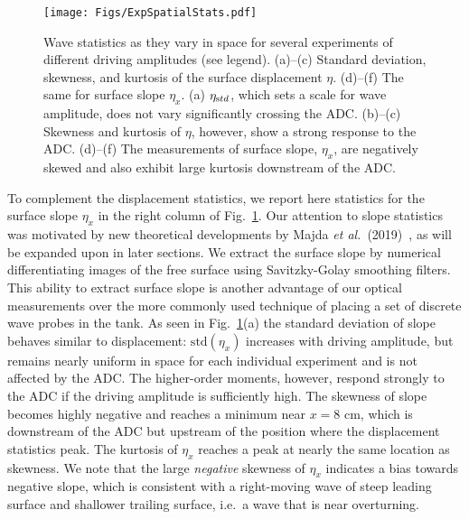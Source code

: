 \documentclass[11pt]{article}
\newcommand{\etastd}{\eta_{\text std}}
\newcommand{\std}{\text{std}}
\newcommand{\maetal}{Majda {\it et al.}~(2019)~}
\begin{document}
\begin{figure}%
\begin{center}
\texttt{[image: Figs/ExpSpatialStats.pdf]}
\caption{Wave statistics as they vary in space for several experiments of different driving amplitudes (see legend). (a)--(c) Standard deviation, skewness, and kurtosis of the surface displacement $\eta$. (d)--(f) The same for surface slope $\eta_x$. (a) $\etastd$, which sets a scale for wave amplitude, does not vary significantly crossing the ADC. (b)--(c) Skewness and kurtosis of $\eta$, however, show a strong response to the ADC. (d)--(f) The measurements of surface slope, $\eta_x$, are negatively skewed and also exhibit large kurtosis downstream of the ADC. }
\label{ExpSpatialStats}
\end{center}
\end{figure}
 
	To complement the displacement statistics, we report here statistics for the surface slope $\eta_x$ in the right column of Fig.~\ref{ExpSpatialStats}. Our attention to slope statistics was motivated by new theoretical developments by \maetal \cite{majda2019}, as will be expanded upon in later sections. We extract the surface slope by numerical differentiating images of the free surface using Savitzky-Golay smoothing filters. This ability to extract surface slope is another advantage of our optical measurements over the more commonly used technique of placing a set of discrete wave probes in the tank. As seen in Fig.~\ref{ExpSpatialStats}(a) the standard deviation of slope behaves similar to displacement: $\std(\eta_x)$ increases with driving amplitude, but remains nearly uniform in space for each individual experiment and is not affected by the ADC. The higher-order moments, however, respond strongly to the ADC if the driving amplitude is sufficiently high. The skewness of slope becomes highly negative and reaches a minimum near $x = 8$ cm, which is downstream of the ADC but upstream of the position where the displacement statistics peak. The kurtosis of $\eta_x$ reaches a peak at nearly the same location as skewness. We note that the large {\em negative} skewness of $\eta_x$ indicates a bias towards negative slope, which is consistent with a right-moving wave of steep leading surface and shallower trailing surface, i.e.~a wave that is near overturning.
\end{document}
